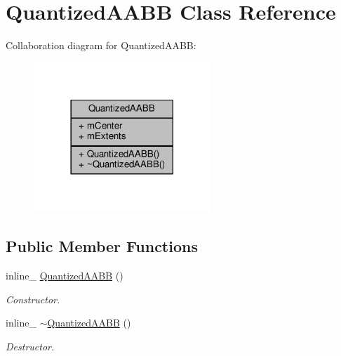 \hypertarget{classQuantizedAABB}{}\section{Quantized\+A\+A\+BB Class Reference}
\label{classQuantizedAABB}


Collaboration diagram for Quantized\+A\+A\+BB\+:
\nopagebreak
\begin{figure}[H]
\begin{center}
\leavevmode
\includegraphics[width=189pt]{d4/d5a/classQuantizedAABB__coll__graph}
\end{center}
\end{figure}
\subsection*{Public Member Functions}
\begin{DoxyCompactItemize}
\item 
inline\+\_\+ \hyperlink{classQuantizedAABB_acba71e9ef587ad3e66fab9806b03fa7a}{Quantized\+A\+A\+BB} ()\hypertarget{classQuantizedAABB_acba71e9ef587ad3e66fab9806b03fa7a}{}\label{classQuantizedAABB_acba71e9ef587ad3e66fab9806b03fa7a}

\begin{DoxyCompactList}\small\item\em Constructor. \end{DoxyCompactList}\item 
inline\+\_\+ \hyperlink{classQuantizedAABB_ab0e4d87bb36b8c3c5efdb7f7bfe436aa}{$\sim$\+Quantized\+A\+A\+BB} ()\hypertarget{classQuantizedAABB_ab0e4d87bb36b8c3c5efdb7f7bfe436aa}{}\label{classQuantizedAABB_ab0e4d87bb36b8c3c5efdb7f7bfe436aa}

\begin{DoxyCompactList}\small\item\em Destructor. \end{DoxyCompactList}\end{DoxyCompactItemize}
